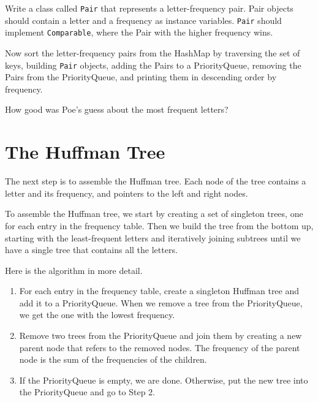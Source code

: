 \begin{exercise}
\label{ex.pair}
Write a class called {\tt Pair} that represents a letter-frequency
pair.  Pair objects should contain a letter and a frequency as
instance variables.  {\tt Pair} should implement {\tt Comparable},
where the Pair with the higher frequency wins.


Now sort the letter-frequency pairs from the HashMap by traversing the
set of keys, building {\tt Pair} objects, adding the Pairs to a
PriorityQueue, removing the Pairs from the PriorityQueue, and printing
them in descending order by frequency.

How good was Poe's guess about the most frequent letters?
\end{exercise}


\section{The Huffman Tree}
\label{hufftree}

The next step is to assemble the Huffman tree.  Each node
of the tree contains a letter and its frequency, and pointers to
the left and right nodes.

To assemble the Huffman tree, we start by creating a set of
singleton trees, one for each entry in the frequency table.
Then we build the tree from the bottom up, starting with the
least-frequent letters and iteratively joining subtrees until
we have a single tree that contains all the letters.

Here is the algorithm in more detail.

\begin{enumerate}

\item For each entry in the frequency table, create a singleton
Huffman tree and add it to a PriorityQueue.  When we remove a tree from
the PriorityQueue, we get the one with the lowest frequency.

\item Remove two trees from the PriorityQueue and join them by creating
a new parent node that refers to the removed nodes.  The frequency
of the parent node is the sum of the frequencies of the children.

\item If the PriorityQueue is empty, we are done.  Otherwise, put the
new tree into the PriorityQueue and go to Step 2.

\end{enumerate}

